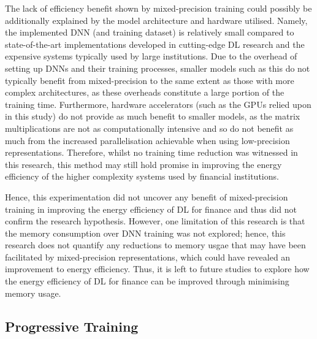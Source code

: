 \documentclass[a4paper, 11pt]{report}
\begin{document}
    The lack of efficiency benefit shown by mixed-precision training could possibly be additionally explained by the model architecture and hardware utilised. Namely, the implemented DNN (and training dataset) is relatively small compared to state-of-the-art implementations developed in cutting-edge DL research and the expensive systems typically used by large institutions. Due to the overhead of setting up DNNs and their training processes, smaller models such as this do not typically benefit from mixed-precision to the same extent as those with more complex architectures, as these overheads constitute a large portion of the training time. Furthermore, hardware accelerators (such as the GPUs relied upon in this study) do not provide as much benefit to smaller models, as the matrix multiplications are not as computationally intensive and so do not benefit as much from the increased parallelisation achievable when using low-precision representations. Therefore, whilst no training time reduction was witnessed in this research, this method may still hold promise in improving the energy efficiency of the higher complexity systems used by financial institutions. 

    Hence, this experimentation did not uncover any benefit of mixed-precision training in improving the energy efficiency of DL for finance and thus did not confirm the research hypothesis. However, one limitation of this research is that the memory consumption over DNN training was not explored; hence, this research does not quantify any reductions to memory usgae that may have been facilitated by mixed-precision representations, which could have revealed an improvement to energy efficiency. Thus, it is left to future studies to explore how the energy efficiency of DL for finance can be improved through minimising memory usage.


    \subsection{Progressive Training}
\end{document}
